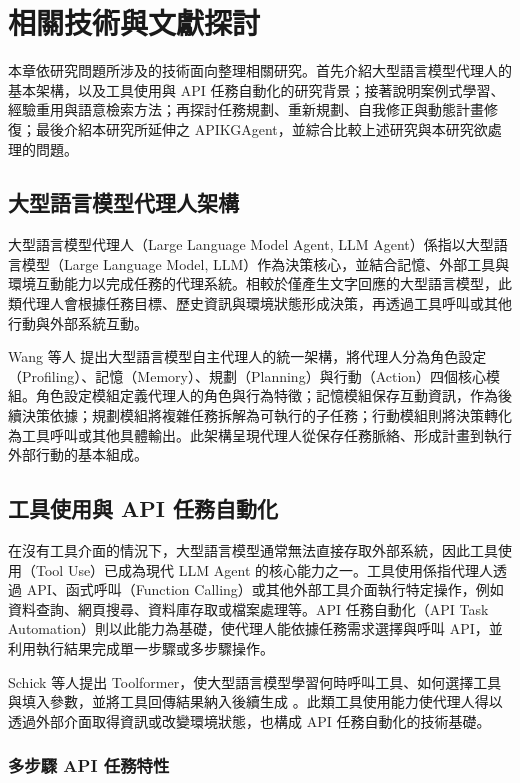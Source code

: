 \chapter{相關技術與文獻探討}

本章依研究問題所涉及的技術面向整理相關研究。首先介紹大型語言模型代理人的基本架構，以及工具使用與 API 任務自動化的研究背景；接著說明案例式學習、經驗重用與語意檢索方法；再探討任務規劃、重新規劃、自我修正與動態計畫修復；最後介紹本研究所延伸之 APIKGAgent，並綜合比較上述研究與本研究欲處理的問題。

\section{大型語言模型代理人架構}

大型語言模型代理人（Large Language Model Agent, LLM Agent）係指以大型語言模型（Large Language Model, LLM）作為決策核心，並結合記憶、外部工具與環境互動能力以完成任務的代理系統。相較於僅產生文字回應的大型語言模型，此類代理人會根據任務目標、歷史資訊與環境狀態形成決策，再透過工具呼叫或其他行動與外部系統互動。

Wang 等人 \cite{wang2024survey} 提出大型語言模型自主代理人的統一架構，將代理人分為角色設定（Profiling）、記憶（Memory）、規劃（Planning）與行動（Action）四個核心模組。角色設定模組定義代理人的角色與行為特徵；記憶模組保存互動資訊，作為後續決策依據；規劃模組將複雜任務拆解為可執行的子任務；行動模組則將決策轉化為工具呼叫或其他具體輸出。此架構呈現代理人從保存任務脈絡、形成計畫到執行外部行動的基本組成。

\section{工具使用與 API 任務自動化}

在沒有工具介面的情況下，大型語言模型通常無法直接存取外部系統，因此工具使用（Tool Use）已成為現代 LLM Agent 的核心能力之一。工具使用係指代理人透過 API、函式呼叫（Function Calling）或其他外部工具介面執行特定操作，例如資料查詢、網頁搜尋、資料庫存取或檔案處理等。API 任務自動化（API Task Automation）則以此能力為基礎，使代理人能依據任務需求選擇與呼叫 API，並利用執行結果完成單一步驟或多步驟操作。

Schick 等人提出 Toolformer，使大型語言模型學習何時呼叫工具、如何選擇工具與填入參數，並將工具回傳結果納入後續生成 \cite{schick2023toolformer}。此類工具使用能力使代理人得以透過外部介面取得資訊或改變環境狀態，也構成 API 任務自動化的技術基礎。

\subsection{多步驟 API 任務特性}

